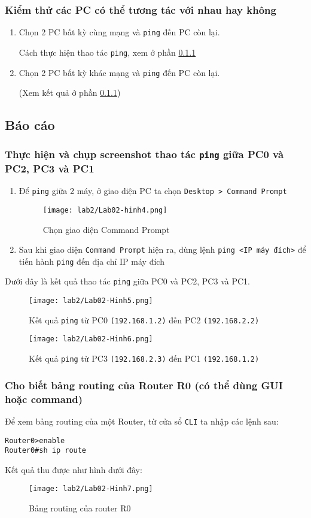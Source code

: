 \documentclass[]{article}
\begin{document}
\subsubsection{Kiểm thử các PC có thể tương tác với nhau hay không}
\begin{enumerate}
\item Chọn 2 PC bất kỳ cùng mạng và \texttt{ping} đến PC còn lại.

Cách thực hiện thao tác \texttt{ping}, xem ở phần \ref{Lab02-task1}
\item Chọn 2 PC bất kỳ khác mạng và \texttt{ping} đến PC còn lại.

(Xem kết quả ở phần \ref{Lab02-task1})
\end{enumerate}

\subsection{Báo cáo}
\subsubsection{Thực hiện và chụp screenshot thao tác \texttt{ping} giữa PC0 và PC2, PC3 và PC1}\label{Lab02-task1}
\begin{enumerate}
\item Để \texttt{ping} giữa 2 máy, ở giao diện PC ta chọn \texttt{Desktop > Command Prompt}\label{howToPing}
\begin{figure}[H]
    \centering
    \texttt{[image: lab2/Lab02-hinh4.png]}
    \caption{Chọn giao diện Command Prompt}
\end{figure}
\item Sau khi giao diện \texttt{Command Prompt} hiện ra, dùng lệnh \texttt{ping <IP máy đích>} để tiến hành \texttt{ping} đến địa chỉ IP máy đích
\end{enumerate}
Dưới đây là kết quả thao tác \texttt{ping} giữa PC0 và PC2, PC3 và PC1.
\begin{figure}[H]
    \centering
    \texttt{[image: lab2/Lab02-Hinh5.png]}
    \caption{Kết quả \texttt{ping} từ PC0 \texttt{(192.168.1.2)} đến PC2 \texttt{(192.168.2.2)}}
\end{figure}
\begin{figure}[H]
    \centering
    \texttt{[image: lab2/Lab02-Hinh6.png]}
    \caption{Kết quả \texttt{ping} từ PC3 \texttt{(192.168.2.3)} đến PC1 \texttt{(192.168.1.2)}}
\end{figure}
\subsubsection{Cho biết bảng routing của Router R0 (có thể dùng GUI hoặc command)}
Để xem bảng routing của một Router, từ cửa sổ \texttt{CLI} ta nhập các lệnh sau:
\begin{lstlisting}
Router0>enable
Router0#sh ip route
\end{lstlisting}
Kết quả thu được như hình dưới đây:
\begin{figure}[H]
    \centering
    \texttt{[image: lab2/Lab02-Hinh7.png]}
    \caption{Bảng routing của router R0}
\end{figure}
\end{document}
